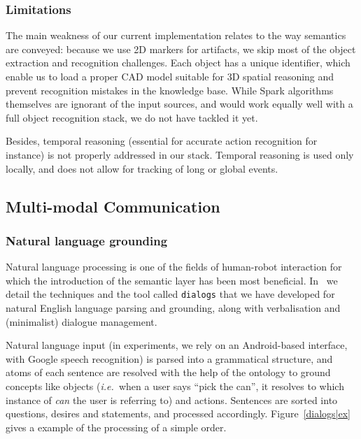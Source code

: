 \documentclass[preprint,3p,times]{elsarticle}
\newcommand{\ie}{{\textit{i.e.\ }}}
\begin{document}
\subsubsection{Limitations}

The main weakness of our current implementation relates to the way semantics are
conveyed: because we use 2D markers for artifacts, we skip most of the object
extraction and recognition challenges. Each object has a unique identifier,
which enable us to load a proper CAD model suitable for 3D spatial reasoning
and prevent recognition mistakes in the knowledge base. While {\sc Spark}
algorithms themselves are ignorant of the input sources, and would work equally
well with a full object recognition stack, we do not have tackled it yet.

Besides, temporal reasoning (essential for accurate action recognition for
instance) is not properly addressed in our stack. Temporal reasoning is used
only locally, and does not allow for tracking of long or global events.


\subsection{Multi-modal Communication}
\label{sect|com}

\subsubsection{Natural language grounding}

Natural language processing is one of the fields of human-robot interaction
for which the introduction of the semantic layer has been most beneficial.
In~\cite{Lemaignan2011a} we detail the techniques and the tool called
\texttt{dialogs} that we have developed for natural English language parsing and
grounding, along with verbalisation and (minimalist) dialogue management.

Natural language input (in experiments, we rely on an Android-based interface,
with Google speech recognition) is parsed into a grammatical structure, and
atoms of each sentence are resolved with the help of the ontology to ground
concepts like objects (\ie when a user says ``pick the can'', it resolves to which
instance of \emph{can} the user is referring to) and actions. Sentences are
sorted into questions, desires and statements, and processed accordingly.
Figure~\ref{dialogs|ex} gives a example of the processing of a simple order.
\end{document}
